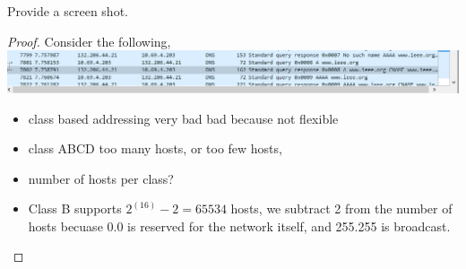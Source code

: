 \documentclass[../../main.tex]{subfiles}
\begin{document}
\providecommand{\diag}{\operatorname{diag}}
\begin{wts}
Provide a screen shot. 
\end{wts}
\begin{proof}
Consider the following,\\
\includegraphics[width=\textwidth]{subfiles/images/308_Lab5_Part_1_PAGE0_1_Image21.png}
\begin{itemize}
    \item class based addressing very bad bad because not flexible
    \item class ABCD too many hosts, or too few hosts,
    \item number of hosts per class?
    \item Class B supports $2^(16)-2 = 65534$ hosts, we subtract 2 from the number of hosts becuase 0.0 is reserved for the network itself, and 255.255 is broadcast.
\end{itemize}
\end{proof}
\end{document}
